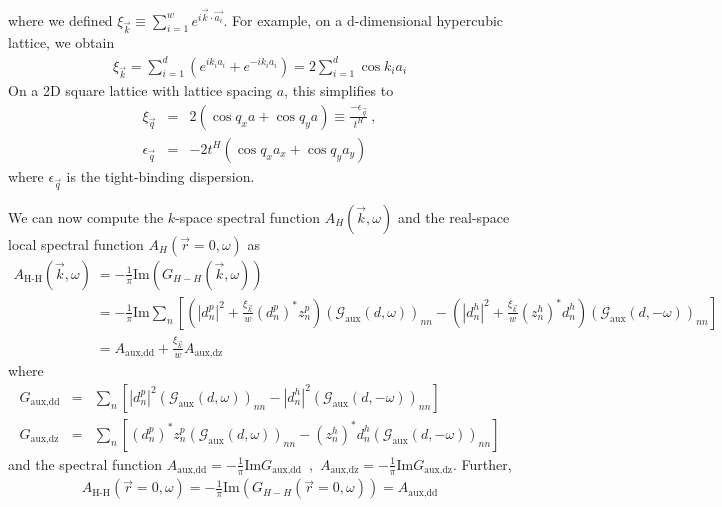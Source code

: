 \documentclass[10pt]{report}
\numberwithin{equation}{section}
\begin{document}
where we defined \(\xi_{\vec k} \equiv \sum_{i=1}^w e^{i \vec{k}\cdot\vec {a_i}}\). For example, on a d-dimensional hypercubic lattice, we obtain
\begin{equation}\begin{aligned}
	\xi_{\vec k} = \sum_{i=1}^d \left(e^{i k_i {a_i}} + e^{-i k_i {a_i}}\right) = 2\sum_{i=1}^d \cos k_i a_i
\end{aligned}\end{equation}
On a 2D square lattice with lattice spacing $a$, this simplifies to
\begin{eqnarray}
	\label{2dsquaretb}
\xi_{\vec{q}} &=& 2(\cos q_{x}a + \cos q_{y}a)\equiv \frac{-\epsilon_{\vec{q}}}{t^{H}}~,\nonumber\\
\epsilon_{\vec{q}} &=& -2t^{H}(\cos q_{x}a_{x} + \cos q_{y}a_{y})~
\end{eqnarray}
where \(\epsilon_{\vec{q}}\) is the tight-binding dispersion.

We can now compute the $k$-space spectral function $A_{H}(\vec{k},\omega)$ and the real-space local spectral function $A_{H}(\vec{r}=0,\omega)$ as
\begin{equation}\begin{aligned}
	A_\text{H-H}(\vec{k},\omega) &= -\frac{1}{\pi} \textrm{Im}(G_{H-H}(\vec{k},\omega))\\ 
	&= -\frac{1}{\pi} \textrm{Im}\sum_n\left[\left(|d^p_n|^2 + \frac{\xi_{\vec k}}{w}\left(d^p_n\right)^* z^p_n\right) \left(\mathcal{G}_\text{aux}(d, \omega)\right)_{nn} - \left(|d^h_n|^2 + \frac{\xi_{\vec k}}{w}\left(z^h_n\right)^* d^h_n\right)\left(\mathcal{G}_\text{aux}(d, -\omega)\right)_{nn}\right]\\
	&= A_\text{aux,dd} + \frac{\xi_{\vec k}}{w} A_\text{aux,dz}
\end{aligned}\end{equation}
where 
\begin{eqnarray}
G_\text{aux,dd} &=& \sum_n\left[|d^p_n|^2 \left(\mathcal{G}_\text{aux}(d, \omega)\right)_{nn} - |d^h_n|^2 \left(\mathcal{G}_\text{aux}(d, -\omega)\right)_{nn}\right]\nonumber\\
G_\text{aux,dz} &=& \sum_n\left[\left(d^p_n\right)^* z^p_n \left(\mathcal{G}_\text{aux}(d, \omega)\right)_{nn} - \left(z^h_n\right)^* d^h_n \left(\mathcal{G}_\text{aux}(d, -\omega)\right)_{nn}\right]
\end{eqnarray}
and the spectral function $A_\text{aux,dd}=-\frac{1}{\pi}\textrm{Im}G_\text{aux,dd}$~,~$A_\text{aux,dz}=-\frac{1}{\pi}\textrm{Im}G_\text{aux,dz}$.
Further,
\begin{equation}\begin{aligned}
A_\text{H-H}(\vec{r}=0,\omega) = -\frac{1}{\pi} \textrm{Im}(G_{H-H}(\vec{r}=0,\omega)) 
= A_\text{aux,dd}
\label{main}
\end{aligned}\end{equation}
\end{document}
